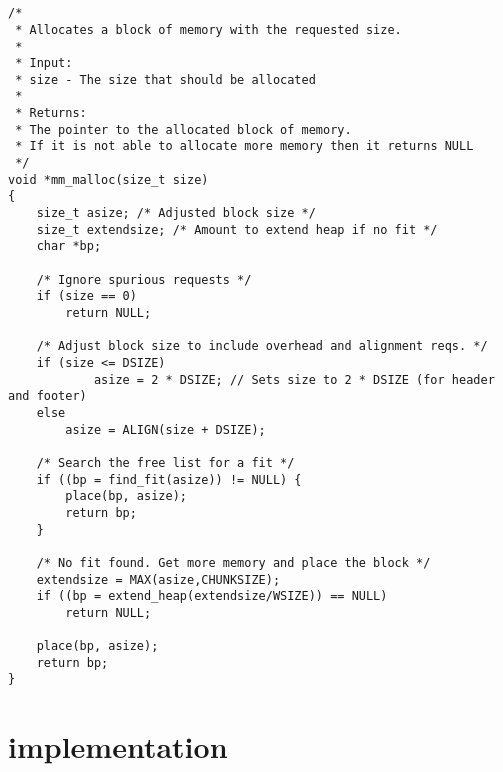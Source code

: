 \appendix


\section{} \label{appendix:malloc}
\begin{lstlisting}
/* 
 * Allocates a block of memory with the requested size.
 * 
 * Input:
 * size - The size that should be allocated
 * 
 * Returns:
 * The pointer to the allocated block of memory. 
 * If it is not able to allocate more memory then it returns NULL
 */
void *mm_malloc(size_t size)
{
    size_t asize; /* Adjusted block size */
    size_t extendsize; /* Amount to extend heap if no fit */
    char *bp;

    /* Ignore spurious requests */
    if (size == 0)
        return NULL;

    /* Adjust block size to include overhead and alignment reqs. */
    if (size <= DSIZE)
            asize = 2 * DSIZE; // Sets size to 2 * DSIZE (for header and footer)
    else
        asize = ALIGN(size + DSIZE); 

    /* Search the free list for a fit */
    if ((bp = find_fit(asize)) != NULL) {
        place(bp, asize);
        return bp; 
    }

    /* No fit found. Get more memory and place the block */
    extendsize = MAX(asize,CHUNKSIZE);
    if ((bp = extend_heap(extendsize/WSIZE)) == NULL)
        return NULL;

    place(bp, asize);
    return bp;
}
\end{lstlisting}

\section{ implementation} \label{appendix:place}

